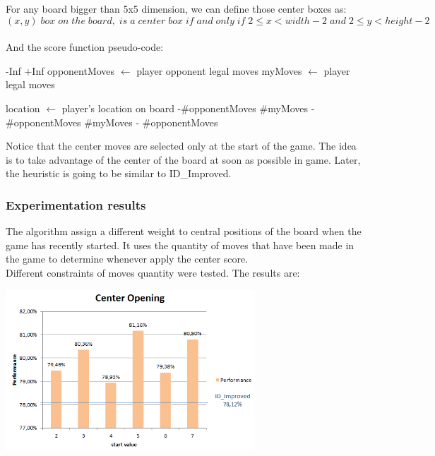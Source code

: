 \documentclass[10pt, a4paper,english]{article}
\begin{document}
For any board bigger than 5x5 dimension, we can define those center boxes as: \\
\[
(x,y) \;box \; on \; the \; board, \;is\; a\; center\; box\; if\; and\; only\; if\; 2 \leq x < width -2 \;and \; 2 \leq y < height - 2
\]
\\
And the score function pseudo-code:\\

\begin{algorithmic}
    \State\Return -Inf
\EndIf    
{}
   \State \Return +Inf
\Else
    \State opponentMoves $\leftarrow$ player opponent legal moves
  	\State myMoves $\leftarrow$ player legal moves
    
		\State location $\leftarrow$ player's location on board
        	\State{}-\#opponentMoves
        \Else
        	\State\Return \#myMoves -  \#opponentMoves
        \EndIf
    \Else
    	\State\Return \#myMoves -  \#opponentMoves
	\EndIf
\EndIf
\EndFunction
\end{algorithmic}

Notice that the center moves are selected only at the start of the game. The idea is to take advantage of the center of the board at soon as possible in game. Later, the heuristic is going to be similar to ID\_Improved.\\

\subsubsection{Experimentation results}

The algorithm assign a different weight to central positions of the board when the game has recently started. It uses the quantity of moves that have been made in the game to determine whenever apply the center score. \\

Different constraints of moves quantity were tested. The results are:\\

\begin{center}
\includegraphics[width=0.7\textwidth]{centeropening.png}\\
\end{center}
\end{document}
